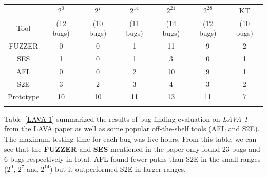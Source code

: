\begin{table}[!b]
{\begin{tabular*}{20pc}{@{\extracolsep{\fill}}ccccccc@{\extracolsep{\fill}}}\toprule
& $2^0$ & $2^7$  & $2^{14}$ & $2^{21}$ & $2^{28}$ & KT \\
	      Tool   & (12 bugs) & (10 bugs) & (11 bugs) & (14 bugs) & (12 bugs) & (10 bugs)\\
\midrule
		FUZZER 		& 0   & 0   & 1    & 11    & 9     & 2  \\
		SES	        & 1   & 0   & 1    & 3     & 0     & 1  \\
		AFL		    & 0   & 0   & 2    & 10    & 9     & 1   \\
		S2E			& 3   & 2   & 3    & 4     & 3     & 2   \\
		Prototype	& 10  & 10  & 11   & 13    & 11    & 7   \\
\botrule
\end{tabular*}}{}
\end{table}

Table~\ref{LAVA-1} summarized the results of bug finding evaluation on \textit{LAVA-1} from the LAVA paper as well as some popular off-the-shelf tools (AFL and S2E). The maximum testing time for each bug was five hours. From this table, we can see that the \textbf{FUZZER} and \textbf{SES} mentioned in the paper only found 23 bugs and 6 bugs respectively in total. AFL found fewer paths than S2E in the small ranges ($2^0$, $2^7$ and $2^{14}$) but it outperformed S2E in larger ranges. 

